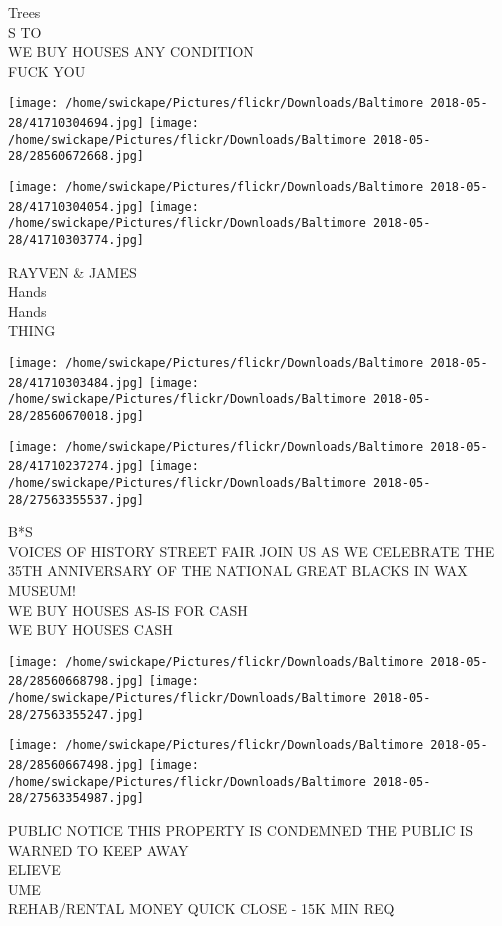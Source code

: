\documentclass[10pt,letterpaper]{article}
\begin{document}
Trees\\
S TO\\
WE BUY HOUSES ANY CONDITION\\
FUCK YOU\\
\pagebreak

\texttt{[image: /home/swickape/Pictures/flickr/Downloads/Baltimore 2018-05-28/41710304694.jpg]}
\texttt{[image: /home/swickape/Pictures/flickr/Downloads/Baltimore 2018-05-28/28560672668.jpg]}

\texttt{[image: /home/swickape/Pictures/flickr/Downloads/Baltimore 2018-05-28/41710304054.jpg]}
\texttt{[image: /home/swickape/Pictures/flickr/Downloads/Baltimore 2018-05-28/41710303774.jpg]}

RAYVEN \& JAMES\\
Hands\\
Hands\\
THING\\
\pagebreak

\texttt{[image: /home/swickape/Pictures/flickr/Downloads/Baltimore 2018-05-28/41710303484.jpg]}
\texttt{[image: /home/swickape/Pictures/flickr/Downloads/Baltimore 2018-05-28/28560670018.jpg]}

\texttt{[image: /home/swickape/Pictures/flickr/Downloads/Baltimore 2018-05-28/41710237274.jpg]}
\texttt{[image: /home/swickape/Pictures/flickr/Downloads/Baltimore 2018-05-28/27563355537.jpg]}

B*S\\
VOICES OF HISTORY STREET FAIR JOIN US AS WE CELEBRATE THE 35TH ANNIVERSARY OF THE NATIONAL GREAT BLACKS IN WAX MUSEUM!\\
WE BUY HOUSES AS{-}IS FOR CASH\\
WE BUY HOUSES CASH\\
\pagebreak

\texttt{[image: /home/swickape/Pictures/flickr/Downloads/Baltimore 2018-05-28/28560668798.jpg]}
\texttt{[image: /home/swickape/Pictures/flickr/Downloads/Baltimore 2018-05-28/27563355247.jpg]}

\texttt{[image: /home/swickape/Pictures/flickr/Downloads/Baltimore 2018-05-28/28560667498.jpg]}
\texttt{[image: /home/swickape/Pictures/flickr/Downloads/Baltimore 2018-05-28/27563354987.jpg]}

PUBLIC NOTICE THIS PROPERTY IS CONDEMNED THE PUBLIC IS WARNED TO KEEP AWAY\\
ELIEVE\\
UME\\
REHAB/RENTAL MONEY QUICK CLOSE {-} 15K MIN REQ\\
\pagebreak
\end{document}
